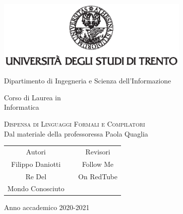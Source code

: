 \documentclass[class=book, crop=false, oneside]{standalone}
\begin{document}
\begin{titlepage}
	\centering
	\includegraphics[width=0.7\textwidth, keepaspectratio]{logo-unitn.eps}

	\vspace{1.4cm}
	\LARGE{Dipartimento di Ingegneria e Scienza dell'Informazione\\}

	\vspace{.9cm}
	\Large{Corso di Laurea in\\ Informatica}

	\vspace{1cm}
	\Huge\textsc{Dispensa di Linguaggi Formali e Compilatori\\}
	\large{Dal materiale della professoressa Paola Quaglia}

	\vspace{2cm}
	\begin{tabularx}{\textwidth}{cXc}
		\Large{Autori} & & \Large{Revisori}\\
		\cmidrule(lr){1-1} \cmidrule(lr){3-3}
		\large{Filippo Daniotti} & & \large{Follow Me}\\
		\large{Re Del} & & \large{On RedTube}\\
		\large{Mondo Conosciuto} & & \\
	\end{tabularx}

	\vspace{1.6cm}
	\LARGE{Anno accademico 2020-2021}
\end{titlepage}
\end{document}

